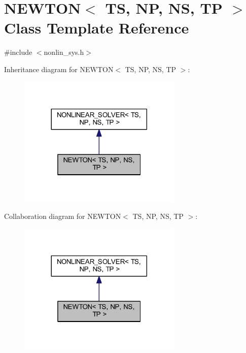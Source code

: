 \hypertarget{class_n_e_w_t_o_n}{}\section{N\+E\+W\+T\+ON$<$ TS, NP, NS, TP $>$ Class Template Reference}
\label{class_n_e_w_t_o_n}


{\ttfamily \#include $<$nonlin\+\_\+sys.\+h$>$}



Inheritance diagram for N\+E\+W\+T\+ON$<$ TS, NP, NS, TP $>$\+:
\nopagebreak
\begin{figure}[H]
\begin{center}
\leavevmode
\includegraphics[width=221pt]{class_n_e_w_t_o_n__inherit__graph}
\end{center}
\end{figure}


Collaboration diagram for N\+E\+W\+T\+ON$<$ TS, NP, NS, TP $>$\+:
\nopagebreak
\begin{figure}[H]
\begin{center}
\leavevmode
\includegraphics[width=221pt]{class_n_e_w_t_o_n__coll__graph}
\end{center}
\end{figure}
